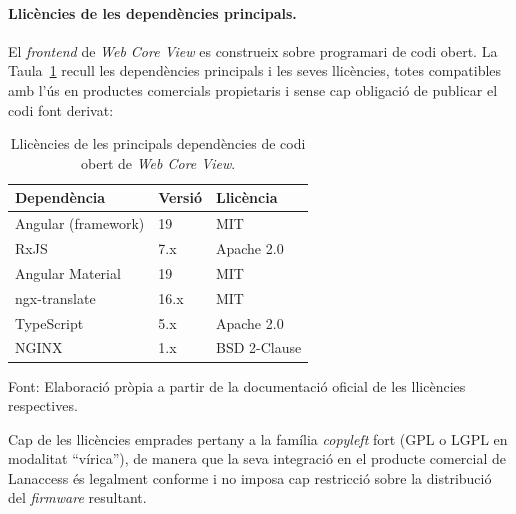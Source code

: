 \paragraph{Llicències de les dependències principals.}
El \textit{frontend} de \textit{Web Core View} es construeix sobre programari de codi obert. La Taula~\ref{tab:llicencies} recull les dependències principals i les seves llicències, totes compatibles amb l'ús en productes comercials propietaris i sense cap obligació de publicar el codi font derivat:

\begin{table}[htbp]
\centering
\begin{tabular}{lll}
\toprule
\textbf{Dependència} & \textbf{Versió} & \textbf{Llicència} \\
\midrule
Angular (framework)  & 19   & MIT \\
RxJS                 & 7.x  & Apache 2.0 \\
Angular Material     & 19   & MIT \\
ngx-translate        & 16.x & MIT \\
TypeScript           & 5.x  & Apache 2.0 \\
NGINX                & 1.x  & BSD 2-Clause \\
\bottomrule
\end{tabular}
\caption{Llicències de les principals dependències de codi obert de \textit{Web Core View}.}
\label{tab:llicencies}
\par\smallskip
\small Font: Elaboració pròpia a partir de la documentació oficial de les llicències respectives.
\end{table}

Cap de les llicències emprades pertany a la família \textit{copyleft} fort (GPL o LGPL en modalitat ``vírica''), de manera que la seva integració en el producte comercial de Lanaccess és legalment conforme i no imposa cap restricció sobre la distribució del \textit{firmware} resultant.